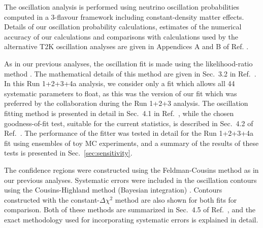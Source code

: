 The oscillation analysis is performed using neutrino oscillation probabilities computed in a 3-flavour
framework including constant-density matter effects. 
Details of our oscillation probability calculations, estimates of the numerical accuracy of our
calculations and comparisons with calculations used by the alternative T2K oscillation analyses 
are given in Appendices A and B of Ref. \cite{OurRun123DisappAnalysis3Flavour}.

As in our previous analyses, the oscillation fit is made using the likelihood-ratio method \cite{StatAnalysisCowan}.
The mathematical details of this method are given in Sec.\ 3.2 in Ref.\ \cite{OurRun1DisappAnalysis}.
In this Run 1+2+3+4a analysis, we consider only a fit which allows all 44 systematic parameters to float,
as this was the version of our fit which was preferred by the collaboration during the Run 1+2+3 analysis.
The oscillation fitting method is presented in detail in Sec.\ 4.1 in Ref.\ \cite{OurRun123DisappAnalysis3Flavour}, 
while the chosen goodness-of-fit test, suitable for the current statistics, is described in Sec.\ 4.2 of  Ref.\ \cite{OurRun123DisappAnalysis3Flavour}.
The performance of the fitter was tested in detail for the Run 1+2+3+4a fit using ensembles of toy MC experiments, and
a summary of the results of these tests is presented in Sec.\ \ref{sec:sensitivity}.

The confidence regions were constructed using the Feldman-Cousins method \cite{FeldmanCousins} as in our previous analyses. 
Systematic errors were included in the oscillation contours using the 
Cousins-Highland method (Bayesian integration) \cite{CousinsHighland}.
Contours constructed with the constant-$\Delta\chi^{2}$ method are also shown for both fits for comparison.
Both of these methods are summarized in Sec.\ 4.5 of Ref.\ \cite{OurRun123DisappAnalysis3Flavour}, and
the exact methodology used for incorporating systematic errors is explained in detail.


